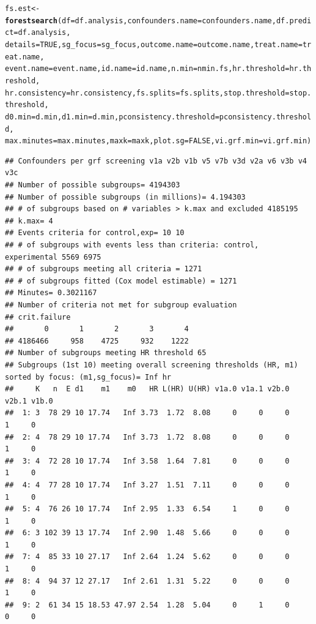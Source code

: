 \documentclass[9pt]{article}\usepackage[]{graphicx}\usepackage[]{xcolor}
\makeatletter
\newcommand{\hlnum}[1]{\textcolor[rgb]{0.686,0.059,0.569}{#1}}%
\newcommand{\hlstd}[1]{\textcolor[rgb]{0.345,0.345,0.345}{#1}}%
\newcommand{\hlkwb}[1]{\textcolor[rgb]{0.69,0.353,0.396}{#1}}%
\newcommand{\hlkwc}[1]{\textcolor[rgb]{0.333,0.667,0.333}{#1}}%
\newcommand{\hlkwd}[1]{\textcolor[rgb]{0.737,0.353,0.396}{\textbf{#1}}}%
\newenvironment{kframe}{%
 \def\at@end@of@kframe{}%
 \ifinner\ifhmode%
  \def\at@end@of@kframe{\end{minipage}}%
  \begin{minipage}{\columnwidth}%
 \fi\fi%
 \def\FrameCommand##1{\hskip\@totalleftmargin \hskip-\fboxsep
 \colorbox{shadecolor}{##1}\hskip-\fboxsep
     \hskip-\linewidth \hskip-\@totalleftmargin \hskip\columnwidth}%
 \MakeFramed {\advance\hsize-\width
   \@totalleftmargin\z@ \linewidth\hsize
   \@setminipage}}%
 {\par\unskip\endMakeFramed%
 \at@end@of@kframe}
\newenvironment{knitrout}{}{} %
\theoremstyle{definition}
\theoremstyle{remark}
\makeatother
\begin{document}
\begin{knitrout}
\begin{kframe}
\begin{alltt}
\hlstd{fs.est} \hlkwb{<-} \hlkwd{forestsearch}\hlstd{(}\hlkwc{df} \hlstd{= df.analysis,} \hlkwc{confounders.name} \hlstd{= confounders.name,} \hlkwc{df.predict} \hlstd{= df.analysis,}
    \hlkwc{details} \hlstd{=} \hlnum{TRUE}\hlstd{,} \hlkwc{sg_focus} \hlstd{= sg_focus,} \hlkwc{outcome.name} \hlstd{= outcome.name,} \hlkwc{treat.name} \hlstd{= treat.name,}
    \hlkwc{event.name} \hlstd{= event.name,} \hlkwc{id.name} \hlstd{= id.name,} \hlkwc{n.min} \hlstd{= nmin.fs,} \hlkwc{hr.threshold} \hlstd{= hr.threshold,}
    \hlkwc{hr.consistency} \hlstd{= hr.consistency,} \hlkwc{fs.splits} \hlstd{= fs.splits,} \hlkwc{stop.threshold} \hlstd{= stop.threshold,}
    \hlkwc{d0.min} \hlstd{= d.min,} \hlkwc{d1.min} \hlstd{= d.min,} \hlkwc{pconsistency.threshold} \hlstd{= pconsistency.threshold,}
    \hlkwc{max.minutes} \hlstd{= max.minutes,} \hlkwc{maxk} \hlstd{= maxk,} \hlkwc{plot.sg} \hlstd{=} \hlnum{FALSE}\hlstd{,} \hlkwc{vi.grf.min} \hlstd{= vi.grf.min)}
\end{alltt}
\begin{verbatim}
## Confounders per grf screening v1a v2b v1b v5 v7b v3d v2a v6 v3b v4 v3c 
## Number of possible subgroups= 4194303 
## Number of possible subgroups (in millions)= 4.194303 
## # of subgroups based on # variables > k.max and excluded 4185195 
## k.max= 4 
## Events criteria for control,exp= 10 10 
## # of subgroups with events less than criteria: control, experimental 5569 6975 
## # of subgroups meeting all criteria = 1271 
## # of subgroups fitted (Cox model estimable) = 1271 
## Minutes= 0.3021167 
## Number of criteria not met for subgroup evaluation 
## crit.failure
##       0       1       2       3       4 
## 4186466     958    4725     932    1222 
## Number of subgroups meeting HR threshold 65 
## Subgroups (1st 10) meeting overall screening thresholds (HR, m1) sorted by focus: (m1,sg_focus)= Inf hr 
##     K   n  E d1    m1    m0   HR L(HR) U(HR) v1a.0 v1a.1 v2b.0 v2b.1 v1b.0
##  1: 3  78 29 10 17.74   Inf 3.73  1.72  8.08     0     0     0     1     0
##  2: 4  78 29 10 17.74   Inf 3.73  1.72  8.08     0     0     0     1     0
##  3: 4  72 28 10 17.74   Inf 3.58  1.64  7.81     0     0     0     1     0
##  4: 4  77 28 10 17.74   Inf 3.27  1.51  7.11     0     0     0     1     0
##  5: 4  76 26 10 17.74   Inf 2.95  1.33  6.54     1     0     0     1     0
##  6: 3 102 39 13 17.74   Inf 2.90  1.48  5.66     0     0     0     1     0
##  7: 4  85 33 10 27.17   Inf 2.64  1.24  5.62     0     0     0     1     0
##  8: 4  94 37 12 27.17   Inf 2.61  1.31  5.22     0     0     0     1     0
##  9: 2  61 34 15 18.53 47.97 2.54  1.28  5.04     0     1     0     0     0

\end{verbatim}
\end{kframe}
\end{knitrout}
\end{document}
